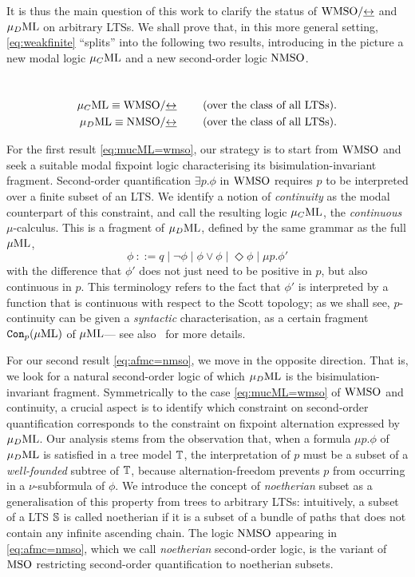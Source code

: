 It is thus the main question of this work to clarify the status of 
$\mathrm{WMSO}/{\mathrel{\underline{\leftrightarrow}}}$ and $\mu_{D}\mathrm{ML}$ on arbitrary LTSs. 
We shall prove that, in this more general setting, \eqref{eq:weakfinite}
``splits'' into the following two results, introducing in the picture a new
modal logic $\mu_{C}\mathrm{ML}$ and a new second-order logic $\mathrm{NMSO}$.

\begin{theorem}~
   \label{t:11}
\begin{eqnarray}
   \mucML \equiv \wmso/{\bis} \qquad  \text{ (over the class of all LTSs)}. 
\label{eq:mucML=wmso} 
\\ \AFMC \equiv \nmso/{\bis}  \qquad \text{ (over the class of all LTSs)}. 
\label{eq:afmc=nmso}
\end{eqnarray}
\end{theorem}
For the first result \eqref{eq:mucML=wmso}, our strategy is to start from 
$\mathrm{WMSO}$ and seek a suitable modal fixpoint logic characterising its 
bisimulation-invariant fragment. 
Second-order quantification $\exists p.\phi$ in $\mathrm{WMSO}$ requires $p$ to be 
interpreted over a finite subset of an LTS. 
We identify a notion of \emph{continuity} as the modal counterpart of this 
constraint, and call the resulting logic $\mu_{C}\mathrm{ML}$, the \emph{continuous} 
$\mu$-calculus. 
This is a fragment of $\mu_{D}\mathrm{ML}$, defined by the same grammar as the full $\mu\mathrm{ML}$,
\begin{equation*}
\phi\ ::= q \mid \neg\phi \mid 
    \phi \lor \phi \mid  \Diamond \phi \mid
    \mu p.\phi' 
\end{equation*}
with the difference that $\phi'$ does not just need to be positive in $p$, but 
also continuous in $p$.
This terminology refers to the fact that $\phi'$ is interpreted by a function 
that is continuous with respect to the Scott topology; as we shall see, 
$p$-continuity can be given a \emph{syntactic} characterisation, as a certain
fragment $\mathtt{Con}_{p}(\mu\mathrm{ML})$ of $\mu\mathrm{ML}$--- see also~\cite{Fontaine08,FV12} for
more details. 

For our second result \eqref{eq:afmc=nmso}, we move in the opposite direction.
That is, we look for a natural second-order logic of which $\mu_{D}\mathrm{ML}$ is the 
bisimulation-invariant fragment. 
Symmetrically to the case \eqref{eq:mucML=wmso} of $\mathrm{WMSO}$ and continuity, a 
crucial aspect is to identify which constraint on second-order quantification
corresponds to the constraint on fixpoint alternation expressed by $\mu_{D}\mathrm{ML}$. 
Our analysis stems from the observation that, when a formula $\mu p.\phi$ of
$\mu_{D}\mathrm{ML}$ is satisfied in a tree model $\mathbb{T}$, the interpretation of $p$ must be
a subset of a \emph{well-founded} subtree of $\mathbb{T}$, because alternation-freedom
prevents $p$ from occurring in a $\nu$-subformula of $\phi$. 
We introduce the concept of \emph{noetherian} subset as a generalisation of 
this property from trees to arbitrary LTSs: intuitively, a subset of a LTS 
$\mathbb{S}$ is called noetherian if it is a subset of a bundle of paths that does
not contain any infinite ascending chain. 
The logic $\mathrm{NMSO}$ appearing in \eqref{eq:afmc=nmso}, which we call 
\emph{noetherian} second-order logic, is the variant of $\mathrm{MSO}$ restricting 
second-order quantification to noetherian subsets.

